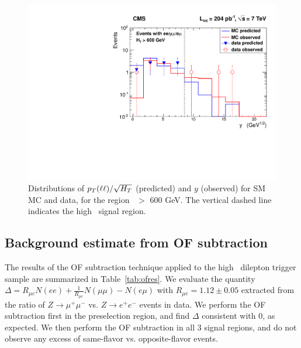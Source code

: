 \begin{figure}[tbh]
\begin{center}
\includegraphics[width=0.6\linewidth]{plots/victory_204pb_ht600.pdf}
\caption{\label{fig:vic3}\protect Distributions of $p_T(\ell\ell)/\sqrt{H_T}$ (predicted) and $y$ (observed) for 
SM MC and data, for the region \Ht\ $>$ 600 GeV. 
The vertical dashed line indicates the high \Ht\ signal region.
}
\end{center}
\end{figure}

\subsection{Background estimate from OF subtraction}
\label{sec:ofres}

The results of the OF subtraction technique applied to the high \pt\ dilepton trigger sample are summarized in Table~\ref{tab:ofres}. 
We evaluate the quantity $\Delta = R_{\mu e}N(ee) + \frac{1}{R_{\mu e}}N(\mu\mu) - N(e\mu)$ with $R_{\mu e} = 1.12 \pm 0.05$
extracted from the ratio of $Z \to \mu^+\mu^-$ vs. $Z \to e^+e^-$ events in data.
We perform the OF subtraction first in the preselection region, and find $\Delta$ consistent with 0, as expected.
We then perform the OF subtraction in all 3 signal regions, and do not observe any excess of same-flavor vs. opposite-flavor events.

